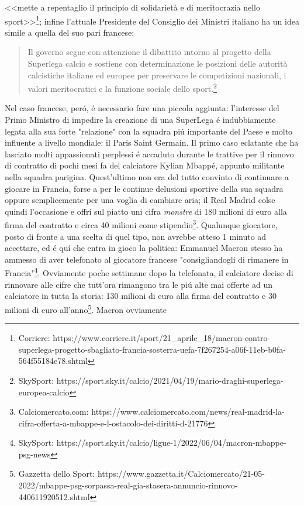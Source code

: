 \documentclass[
    corpo=12pt,
    oneside,
    evenboxes,
    tipotesi=triennale,
    stile=classica,
    oldstyle,
    autoretitolo,
    greek,
]{toptesi}
\begin{document}
\begin{interlinea}{1.5}
<<mette a repentaglio il principio di solidarietà e di meritocrazia nello sport>>\footnote{Corriere: https://www.corriere.it/sport/21\_aprile\_18/macron-contro-superlega-progetto-sbagliato-francia-sosterra-uefa-7f267254-a06f-11eb-b0fa-564f55184e78.shtml};
infine l'attuale Presidente del Consiglio dei Ministri italiano ha un idea simile a quella del suo pari francese: \begin{quote}
    \small Il governo segue con attenzione il dibattito intorno al progetto della Superlega calcio e sostiene con determinazione le posizioni delle autorità calcistiche italiane ed europee per preservare le competizioni nazionali, i valori meritocratici e la funzione sociale dello sport.\footnote{SkySport: https://sport.sky.it/calcio/2021/04/19/mario-draghi-superlega-europea-calcio}
\end{quote} 
Nel caso francese, per\'o, \'e necessario fare una piccola aggiunta: l'interesse del Primo Ministro di impedire la creazione di una SuperLega
\'e indubbiamente legata alla sua forte "relazione" con la squadra pi\'u importante del Paese e molto influente a livello mondiale: il Paris Saint Germain.
Il primo caso eclatante che ha lasciato molti appassionati perplessi \'e accaduto durante le trattive per il rinnovo di contratto di pochi mesi fa del calciatore
Kylian Mbapp\'e, appunto militante nella squadra parigina. Quest'ultimo non era del tutto convinto di continuare a giocare in Francia, forse 
a per le continue delusioni sportive della sua squadra oppure semplicemente per una voglia di cambiare aria; il Real Madrid colse quindi l'occasione e offr\'i
sul piatto uni cifra \emph{monstre} di 180 milioni di euro alla firma del contratto e circa 40 milioni come stipendio\footnote{Calciomercato.com: https://www.calciomercato.com/news/real-madrid-la-cifra-offerta-a-mbappe-e-l-ostacolo-dei-diritti-d-21776}.
Qualunque giocatore, posto di fronte a una scelta di quel tipo, non avrebbe atteso 1 minuto ad accettare, ed \'e qu\'i che entra in gioco la politica: Emmanuel Macron 
stesso ha ammesso di aver telefonato al giocatore francese "consigliandogli di rimanere in Francia"\footnote{SkySport: https://sport.sky.it/calcio/ligue-1/2022/06/04/macron-mbappe-psg-news}.
Ovviamente poche settimane dopo la telefonata, il calciatore decise di rinnovare alle cifre che tutt'ora rimangono tra le pi\'u alte mai
offerte ad un calciatore in tutta la storia: 130 milioni di euro alla firma del contratto e 30 milioni di euro all'anno\footnote{Gazzetta dello Sport: https://www.gazzetta.it/Calciomercato/21-05-2022/mbappe-psg-sorpassa-real-gia-stasera-annuncio-rinnovo-440611920512.shtml}. Macron ovviamente 

\end{interlinea}
\end{document}
